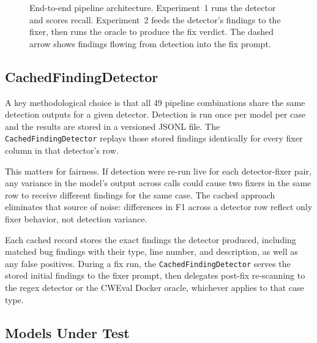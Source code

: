 \documentclass[12pt]{article}
\begin{document}
\begin{figure}[H]
\caption{End-to-end pipeline architecture. Experiment~1 runs the detector and
scores recall. Experiment~2 feeds the detector's findings to the fixer, then
runs the oracle to produce the fix verdict. The dashed arrow shows findings
flowing from detection into the fix prompt.}
\label{fig:pipeline}
\end{figure}

\subsection{CachedFindingDetector}

A key methodological choice is that all 49 pipeline combinations share the
same detection outputs for a given detector. Detection is run once per model
per case and the results are stored in a versioned JSONL file. The
\texttt{CachedFindingDetector} replays those stored findings identically for
every fixer column in that detector's row.

This matters for fairness. If detection were re-run live for each
detector-fixer pair, any variance in the model's output across calls could
cause two fixers in the same row to receive different findings for the same
case. The cached approach eliminates that source of noise: differences in F1
across a detector row reflect only fixer behavior, not detection variance.

Each cached record stores the exact findings the detector produced, including
matched bug findings with their type, line number, and description, as well as
any false positives. During a fix run, the \texttt{CachedFindingDetector}
serves the stored initial findings to the fixer prompt, then delegates
post-fix re-scanning to the regex detector or the CWEval Docker oracle,
whichever applies to that case type.

\subsection{Models Under Test}
\end{document}
